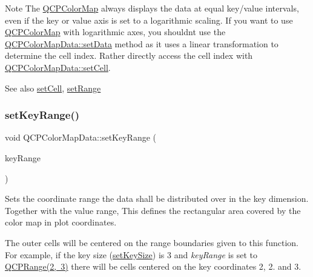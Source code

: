\begin{DoxyNote}{Note}
The \mbox{\hyperlink{class_q_c_p_color_map}{Q\+C\+P\+Color\+Map}} always displays the data at equal key/value intervals, even if the key or value axis is set to a logarithmic scaling. If you want to use \mbox{\hyperlink{class_q_c_p_color_map}{Q\+C\+P\+Color\+Map}} with logarithmic axes, you shouldn\textquotesingle{}t use the \mbox{\hyperlink{class_q_c_p_color_map_data_afd2083ccfd6987ec94aa7ef8e91ca39a}{Q\+C\+P\+Color\+Map\+Data\+::set\+Data}} method as it uses a linear transformation to determine the cell index. Rather directly access the cell index with \mbox{\hyperlink{class_q_c_p_color_map_data_a8e75eaf8746596319032a93f3d2d0683}{Q\+C\+P\+Color\+Map\+Data\+::set\+Cell}}.
\end{DoxyNote}
\begin{DoxySeeAlso}{See also}
\mbox{\hyperlink{class_q_c_p_color_map_data_a8e75eaf8746596319032a93f3d2d0683}{set\+Cell}}, \mbox{\hyperlink{class_q_c_p_color_map_data_aad9c1c7c703c1339489fc730517c83d4}{set\+Range}} 
\end{DoxySeeAlso}
\mbox{\label{class_q_c_p_color_map_data_a0738c485f3c9df9ea1241b7a8bb6a86e}} 
\subsubsection{\texorpdfstring{setKeyRange()}{setKeyRange()}}
{\footnotesize\ttfamily void Q\+C\+P\+Color\+Map\+Data\+::set\+Key\+Range (\begin{DoxyParamCaption}\item[{const \mbox{\hyperlink{class_q_c_p_range}{Q\+C\+P\+Range}} \&}]{key\+Range }\end{DoxyParamCaption})}

Sets the coordinate range the data shall be distributed over in the key dimension. Together with the value range, This defines the rectangular area covered by the color map in plot coordinates.

The outer cells will be centered on the range boundaries given to this function. For example, if the key size (\mbox{\hyperlink{class_q_c_p_color_map_data_ac7ef70e383aface34b44dbde49234b6b}{set\+Key\+Size}}) is 3 and {\itshape key\+Range} is set to {\ttfamily \mbox{\hyperlink{class_q_c_p_range}{Q\+C\+P\+Range(2, 3)}}} there will be cells centered on the key coordinates 2, 2. and 3.

